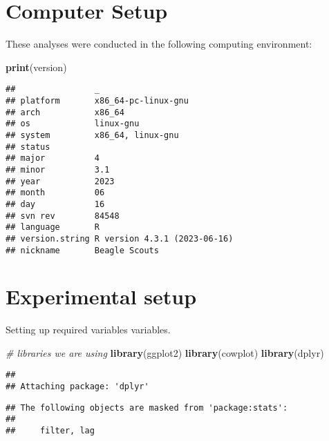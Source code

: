 \documentclass[]{book}
\newenvironment{Shaded}{\begin{snugshade}}{\end{snugshade}}
\newcommand{\CommentTok}[1]{\textcolor[rgb]{0.56,0.35,0.01}{\textit{#1}}}
\newcommand{\KeywordTok}[1]{\textcolor[rgb]{0.13,0.29,0.53}{\textbf{#1}}}
\newcommand{\NormalTok}[1]{#1}
\begin{document}
\hypertarget{computer-setup}{%
\section{Computer Setup}\label{computer-setup}}

These analyses were conducted in the following computing environment:

\begin{Shaded}
\begin{Highlighting}[]
\KeywordTok{print}\NormalTok{(version)}
\end{Highlighting}
\end{Shaded}

\begin{verbatim}
##                _                           
## platform       x86_64-pc-linux-gnu         
## arch           x86_64                      
## os             linux-gnu                   
## system         x86_64, linux-gnu           
## status                                     
## major          4                           
## minor          3.1                         
## year           2023                        
## month          06                          
## day            16                          
## svn rev        84548                       
## language       R                           
## version.string R version 4.3.1 (2023-06-16)
## nickname       Beagle Scouts
\end{verbatim}

\hypertarget{experimental-setup}{%
\section{Experimental setup}\label{experimental-setup}}

Setting up required variables variables.

\begin{Shaded}
\begin{Highlighting}[]
\CommentTok{# libraries we are using}
\KeywordTok{library}\NormalTok{(ggplot2)}
\KeywordTok{library}\NormalTok{(cowplot)}
\KeywordTok{library}\NormalTok{(dplyr)}
\end{Highlighting}
\end{Shaded}

\begin{verbatim}
## 
## Attaching package: 'dplyr'
\end{verbatim}

\begin{verbatim}
## The following objects are masked from 'package:stats':
## 
##     filter, lag
\end{verbatim}
\end{document}
